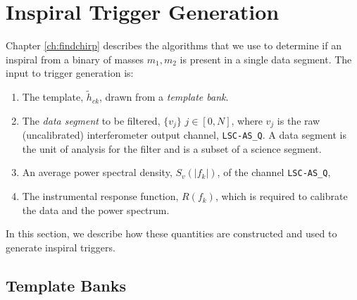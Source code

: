 \section{Inspiral Trigger Generation}
\label{s:pipetemplate}

Chapter \ref{ch:findchirp} describes the algorithms that we use to determine
if an inspiral from a binary of masses ${m_1,m_2}$ is present in a single data
segment. The input to trigger generation is:
\begin{enumerate}
\item The template, $\tilde{h}_{ck}$, drawn from a \emph{template bank}.

\item The \emph{data segment} to be filtered, $\{v_j\}$ $j \in [0,N]$, where
$v_j$ is the raw (uncalibrated) interferometer output channel,
\texttt{LSC-AS\_Q}. A data segment is the unit of analysis for the filter and
is a subset of a science segment.

\item An average power spectral density, $S_v(|f_k|)$, of the channel 
\texttt{LSC-AS\_Q},

\item The instrumental response function, $R(f_k)$, which is required to
calibrate the data and the power spectrum. 
\end{enumerate}
In this section, we describe how these quantities are constructed and used to
generate inspiral triggers.

\subsection{Template Banks}
\label{ss:templatebank}

